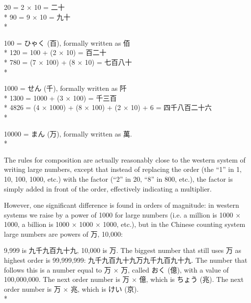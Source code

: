 \documentclass[11pt, b5paper, twoside, openright, onecolumn]{book}
\makeatletter
\newcommand*{\rubystack}[2]{{\relscale{0.5}%
  \begin{tabular}[b]{@{}c@{}}%
    {#1}\\%
   {\textscale{2}{#2}}%
  \end{tabular}}%
}
\DeclareRobustCommand*{\ruby}[2]{%
  \mbox{%
    \setlength{\parskip}{0ex}%
    \BeginAccSupp{method=pdfstringdef,ActualText={#1}}%
      \rubystack{\phantom{#2}}{#1}%
      \llap{%
        \rubystack{#2}{\phantom{#1}}%
      }%
    \EndAccSupp{}%
  }%
}
\renewcommand*{\ruby}[2]{#2 (#1)}%
\newenvironment{exampleblock}{
\setlength{\parindent}{0.6in}
\begin{minipage}[t]{\dimexpr\textwidth-\parindent}}
{\end{minipage}}
\makeatother
\begin{document}
\vspace{0.4cm}
\begin{exampleblock}
20 = 2 × 10 = 二十 \\* 
90 = 9 × 10 = 九十 \\* 
\end{exampleblock}
\vspace{0.2cm}

\begin{exampleblock}
100 = \ruby{百}{ひゃく}‚ formally written as 佰 \\* 
120 = 100 + (2 × 10) = 百二十 \\* 
780 = (7 × 100) + (8 × 10) = 七百八十 \\* 
\end{exampleblock}
\vspace{0.2cm}

\begin{exampleblock}
1000 = \ruby{千}{せん}‚ formally written as 阡 \\* 
1300 = 1000 + (3 × 100) = 千三百 \\* 
4826 = (4 × 1000) + (8 × 100) + (2 × 10) + 6 = 四千八百二十六 \\* 
\end{exampleblock}
\vspace{0.2cm}

\begin{exampleblock}
10000 = \ruby{万}{まん}‚ formally written as 萬. \\* 
\end{exampleblock}
\vspace{0.2cm}

The rules for composition are actually reasonably close to the western system of writing large numbers‚ except that instead of replacing the order (the “1” in 1‚ 10‚ 100‚ 1000‚ etc.) with the factor (“2” in 20‚ “8” in 800‚ etc.)‚ the factor is simply added in front of the order‚ effectively indicating a multiplier.

However‚ one significant difference is found in orders of magnitude: in western systems we raise by a power of 1000 for large numbers (i.e. a million is 1000 × 1000‚ a billion is 1000 × 1000 × 1000‚ etc.)‚ but in the Chinese counting system large numbers are powers of 万‚ 10‚000:

\vspace{0.4cm}
\begin{exampleblock}
9‚999 is 九千九百九十九‚ 10‚000 is 万. The biggest number that still uses 万 as highest order is 99‚999‚999: 九千九百九十九万九千九百九十九. The number that follows this is a number equal to 万 × 万‚ called \ruby{億}{おく}‚ with a value of 100‚000‚000. The next order number is 万 × 億‚ which is \ruby{兆}{ちょう}. The next order number is 万 × 兆‚ which is \ruby{京}{けい}. \\* 
\end{exampleblock}
\vspace{0.2cm}
\end{document}
